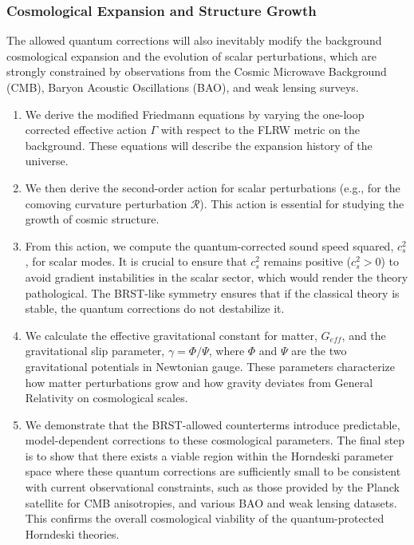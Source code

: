 \documentclass[twocolumn]{aastex631}
\begin{document}
\subsubsection{Cosmological Expansion and Structure Growth}
The allowed quantum corrections will also inevitably modify the background cosmological expansion and the evolution of scalar perturbations, which are strongly constrained by observations from the Cosmic Microwave Background (CMB), Baryon Acoustic Oscillations (BAO), and weak lensing surveys.
\begin{enumerate}
    \item We derive the modified Friedmann equations by varying the one-loop corrected effective action $\Gamma$ with respect to the FLRW metric on the background. These equations will describe the expansion history of the universe.
    \item We then derive the second-order action for scalar perturbations (e.g., for the comoving curvature perturbation $\mathcal{R}$). This action is essential for studying the growth of cosmic structure.
    \item From this action, we compute the quantum-corrected sound speed squared, $c_s^2$, for scalar modes. It is crucial to ensure that $c_s^2$ remains positive ($c_s^2 > 0$) to avoid gradient instabilities in the scalar sector, which would render the theory pathological. The BRST-like symmetry ensures that if the classical theory is stable, the quantum corrections do not destabilize it.
    \item We calculate the effective gravitational constant for matter, $G_{eff}$, and the gravitational slip parameter, $\gamma = \Phi/\Psi$, where $\Phi$ and $\Psi$ are the two gravitational potentials in Newtonian gauge. These parameters characterize how matter perturbations grow and how gravity deviates from General Relativity on cosmological scales.
    \item We demonstrate that the BRST-allowed counterterms introduce predictable, model-dependent corrections to these cosmological parameters. The final step is to show that there exists a viable region within the Horndeski parameter space where these quantum corrections are sufficiently small to be consistent with current observational constraints, such as those provided by the Planck satellite for CMB anisotropies, and various BAO and weak lensing datasets. This confirms the overall cosmological viability of the quantum-protected Horndeski theories.
\end{enumerate}
\end{document}
